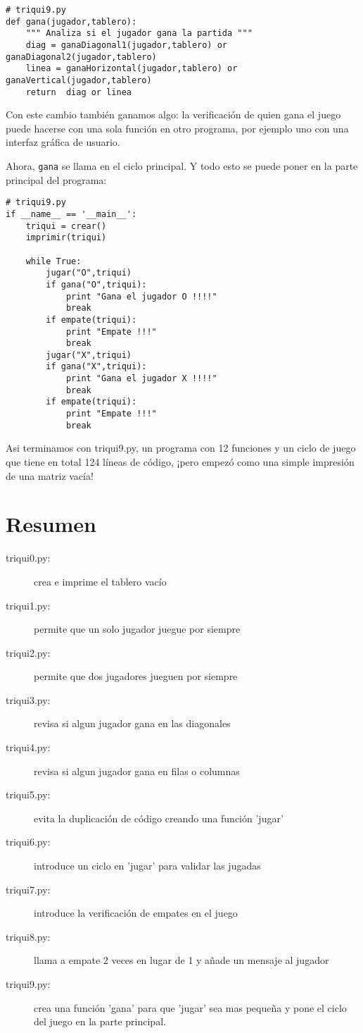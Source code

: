 \begin{verbatim}
# triqui9.py
def gana(jugador,tablero):
    """ Analiza si el jugador gana la partida """
    diag = ganaDiagonal1(jugador,tablero) or ganaDiagonal2(jugador,tablero)
    linea = ganaHorizontal(jugador,tablero) or ganaVertical(jugador,tablero)
    return  diag or linea

\end{verbatim}
\afterverb

Con este cambio también ganamos algo: la verificación de quien gana el juego
puede hacerse con una sola función en otro programa, por ejemplo uno con 
una interfaz gráfica de usuario.

Ahora, \texttt{gana} se llama en el ciclo principal. Y todo esto se puede poner en 
la parte principal del programa:

\begin{verbatim}
# triqui9.py
if __name__ == '__main__':
    triqui = crear()
    imprimir(triqui)

    while True:
        jugar("O",triqui)
        if gana("O",triqui):
            print "Gana el jugador O !!!!"
            break
        if empate(triqui):
            print "Empate !!!"
            break
        jugar("X",triqui)
        if gana("X",triqui):
            print "Gana el jugador X !!!!"
            break
        if empate(triqui):
            print "Empate !!!"
            break
\end{verbatim}
\afterverb

Asi terminamos con triqui9.py, un programa con 12 funciones y un ciclo de juego que
tiene en total 124 líneas de código, ¡pero empezó como una simple impresión de una 
matriz vacía!

\section{Resumen}

\begin{description}
\item[triqui0.py:] crea e imprime el tablero vacío
\item[triqui1.py:] permite que un solo jugador juegue por siempre
\item[triqui2.py:] permite que dos jugadores jueguen por siempre
\item[triqui3.py:] revisa si algun jugador gana en las diagonales
\item[triqui4.py:] revisa si algun jugador gana en filas o columnas
\item[triqui5.py:] evita la duplicación de código creando una función 'jugar'
\item[triqui6.py:] introduce un ciclo en 'jugar' para validar las jugadas 
\item[triqui7.py:] introduce la verificación de empates en el juego
\item[triqui8.py:] llama a empate 2 veces en lugar de 1 y añade un mensaje al jugador
\item[triqui9.py:] crea una función 'gana' para que 'jugar' sea mas pequeña y pone el ciclo 
            del juego en la parte principal.
\end{description}

